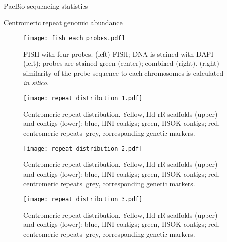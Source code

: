 \begin{table}[htbp]
  \centering
  \caption{PacBio sequencing statistics}
  
  \label{sequencing_stats}
\end{table}

\begin{table}[htbp]
  \centering
  \caption{Centromeric repeat genomic abundance}
  
  \label{centromeric_repeat_genomic_abundance}
\end{table}

\begin{figure}[p]
  \centering
  \texttt{[image: fish\_each\_probes.pdf]}
  \caption{
    FISH with four probes. (left) FISH; DNA is stained with DAPI (left); probes are stained green (center); combined (right). (right) similarity of the probe sequence to each chromosomes is calculated \textit{in silico}.
  }
  \label{fish_each}
\end{figure}


\begin{figure}[p]
  \centering
  \texttt{[image: repeat\_distribution\_1.pdf]}
  \caption{
    Centromeric repeat distribution. Yellow, Hd-rR scaffolds (upper) and contigs (lower); blue, HNI contigs; green, HSOK contigs; red, centromeric repeats; grey, corresponding genetic markers.
  }
  \label{fig:repeat_distribution}
\end{figure}

\addtocounter{figure}{-1}
\begin{figure}[p]
  \centering
  \texttt{[image: repeat\_distribution\_2.pdf]}
  \caption{
    Centromeric repeat distribution. Yellow, Hd-rR scaffolds (upper) and contigs (lower); blue, HNI contigs; green, HSOK contigs; red, centromeric repeats; grey, corresponding genetic markers.
  }
  \label{fig:repeat_distribution}
\end{figure}

\addtocounter{figure}{-1}
\begin{figure}[p]
  \centering
  \texttt{[image: repeat\_distribution\_3.pdf]}
  \caption{
    Centromeric repeat distribution. Yellow, Hd-rR scaffolds (upper) and contigs (lower); blue, HNI contigs; green, HSOK contigs; red, centromeric repeats; grey, corresponding genetic markers.
  }
  \label{fig:repeat_distribution}
\end{figure}



